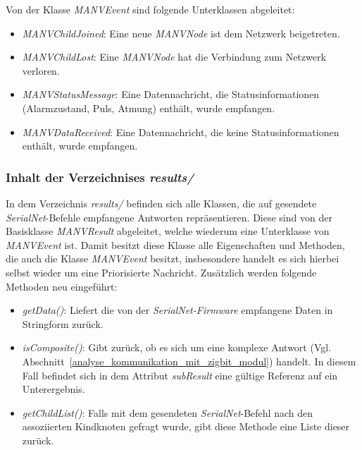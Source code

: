     Von der Klasse \emph{MANVEvent} sind folgende Unterklassen abgeleitet:

    \begin{itemize}
        \item{\emph{MANVChildJoined}:} Eine neue \emph{MANVNode} ist dem Netzwerk beigetreten.
        \item{\emph{MANVChildLost}:} Eine \emph{MANVNode} hat die Verbindung zum Netzwerk verloren.
        \item{\emph{MANVStatusMessage}:} Eine Datennachricht, die Statusinformationen (Alarmzustand, Puls, Atmung) enthält,
                                  wurde empfangen.
        \item{\emph{MANVDataReceived}:} Eine Datennachricht, die keine Statusinformationen enthält, wurde empfangen.
    \end{itemize}

    \subsubsection{Inhalt der Verzeichnises \emph{results/}}

    In dem Verzeichnis \emph{results/} befinden sich alle Klassen, die auf gesendete \emph{SerialNet}-Befehle empfangene 
    Antworten repräsentieren. Diese sind von der Basisklasse \emph{MANVResult} abgeleitet, welche wiederum eine Unterklasse 
    von \emph{MANVEvent} ist.  Damit besitzt diese Klasse alle Eigenschaften und Methoden, die auch die 
    Klasse \emph{MANVEvent} besitzt, insbesondere handelt es sich hierbei selbst wieder um eine Priorisierte Nachricht. 
    Zusätzlich werden folgende Methoden neu eingeführt:

    \begin{itemize}
        \item{\emph{getData()}:} Liefert die von der \emph{SerialNet-Firmware} empfangene Daten in Stringform zurück. 
        \item{\emph{isComposite()}:} Gibt zurück, ob es sich um eine komplexe Antwort (Vgl. 
                            Abschnitt~\ref{analyse_kommunikation_mit_zigbit_modul}) handelt. In diesem Fall befindet 
                            sich in dem Attribut \emph{subResult} eine gültige Referenz auf ein Unterergebnis.
        \item{\emph{getChildList()}:} Falls mit dem gesendeten \emph{SerialNet}-Befehl nach den assoziierten Kindknoten gefragt wurde,
                             gibt diese Methode eine Liste dieser zurück.
    \end{itemize}

